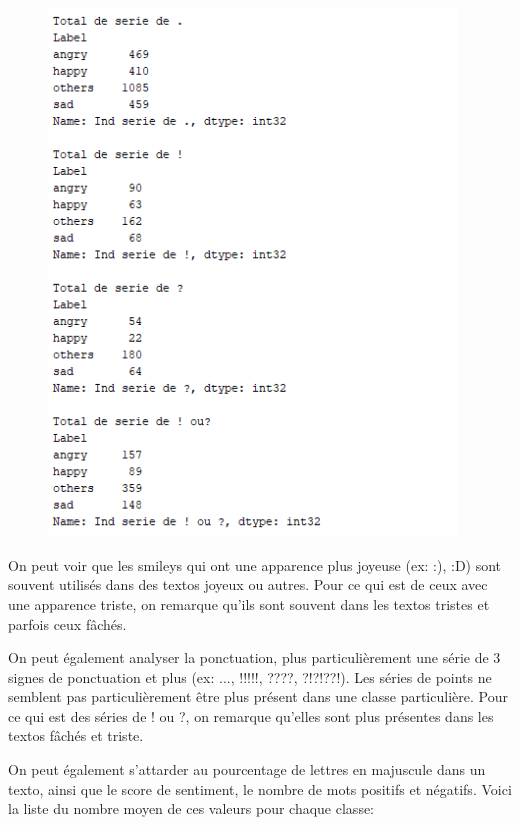 \documentclass[12pt,french]{article}
\begin{document}
\begin{figure}[h!]
\begin{minipage}[b]{0.3\textwidth}
	\end{minipage}
	\hfill
	\begin{minipage}[b]{0.3\textwidth}
		\includegraphics[width=\textwidth,height=14cm]{analyse_car_ponctuation}
	\end{minipage}
\end{figure}

On peut voir que les smileys qui ont une apparence plus joyeuse (ex: :), :D) sont souvent utilisés dans des textos joyeux ou autres. Pour ce qui est de ceux avec une apparence triste, on remarque qu'ils sont souvent dans les textos tristes et parfois ceux fâchés.

On peut également analyser la ponctuation, plus particulièrement une série de 3 signes de ponctuation et plus (ex: ..., !!!!!, ????, ?!?!??!). Les séries de points ne semblent pas particulièrement être plus présent dans une classe particulière. Pour ce qui est des séries de ! ou ?, on remarque qu'elles sont plus présentes dans les textos fâchés et triste.

On peut également s'attarder au pourcentage de lettres en majuscule dans un texto, ainsi que le score de sentiment, le nombre de mots positifs et négatifs. Voici la liste du nombre moyen de ces valeurs pour chaque classe:
\end{document}
